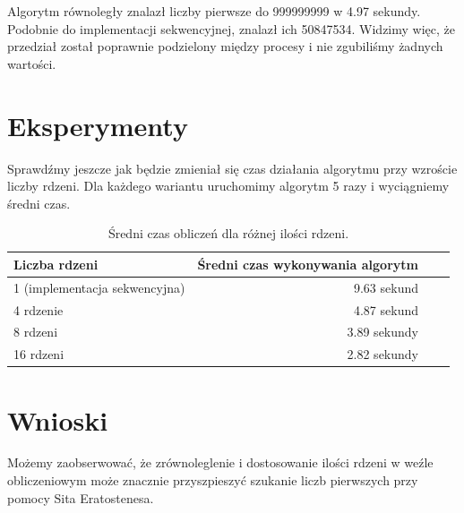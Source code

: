 \documentclass{article}
\begin{document}
Algorytm równoległy znalazł liczby pierwsze do 999999999 w 4.97 sekundy. Podobnie do implementacji sekwencyjnej, znalazł ich 50847534. Widzimy więc, że przedział został poprawnie podzielony między procesy i nie zgubiliśmy żadnych wartości.

\section*{Eksperymenty}
Sprawdźmy jeszcze jak będzie zmieniał się czas działania algorytmu przy wzroście liczby rdzeni. Dla każdego wariantu uruchomimy algorytm 5 razy i wyciągniemy średni czas.

\begin{table}[ht]
\centering
\begin{tabular}{|l|r|r|r|}
\hline
\rowcolor{orange!40} 
Liczba rdzeni & Średni czas wykonywania algorytm  \\\hline
1 (implementacja sekwencyjna) & 9.63 sekund \\\hline
4 rdzenie &  4.87 sekund \\\hline
8 rdzeni &  3.89 sekundy \\\hline
16 rdzeni &  2.82 sekundy \\\hline

\end{tabular}
\caption{\label{tab:widgets}Średni czas obliczeń dla różnej ilości rdzeni.}
\end{table}

\section*{Wnioski}
Możemy zaobserwować, że zrównoleglenie i dostosowanie ilości rdzeni w weźle obliczeniowym może znacznie przyszpieszyć szukanie liczb pierwszych przy pomocy Sita Eratostenesa.
\end{document}
